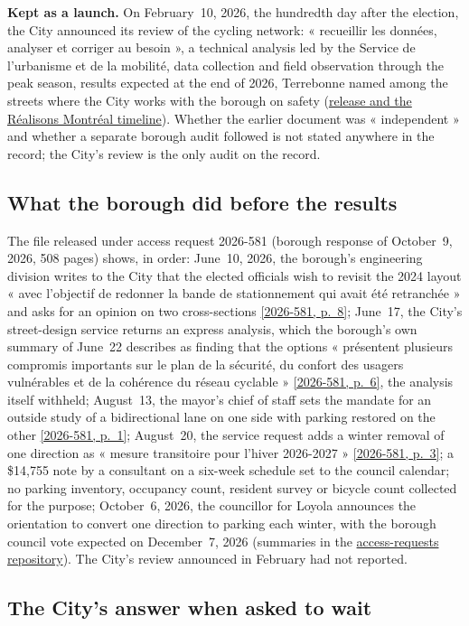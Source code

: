 \documentclass[11pt,letterpaper]{article}
\newcommand{\repourl}{https://github.com/OpenMobilityData/Terrebonne-open-sources}
\newcommand{\doc}[2]{\href{\repourl/blob/main/#1}{#2}}
\newcommand{\arurl}{https://github.com/OpenMobilityData/Terrebonne-access-requests}
\newcommand{\pagesurl}{https://openmobilitydata.github.io/Terrebonne-access-requests}
\newcommand{\pgl}[2]{\href{\pagesurl/2026-581/raw/01_emails_mandate_counts.pdf\#page=#1}{\textsf{\small[2026-581, p.~#2]}}}
\newcommand{\pg}[1]{\pgl{#1}{#1}}
\begin{document}
\textbf{Kept as a launch.} On February~10, 2026, the hundredth day after the
election, the City announced its review of the cycling network: « recueillir
les données, analyser et corriger au besoin », a technical analysis led by the
Service de l'urbanisme et de la mobilité, data collection and field
observation through the peak season, results expected at the end of 2026,
Terrebonne named among the streets where the City works with the borough on
safety (\doc{2026-city-audit-and-plan-velo/}{release and the Réalisons
Montréal timeline}). Whether the earlier document was « independent » and
whether a separate borough audit followed is not stated anywhere in the
record; the City's review is the only audit on the record.

\subsection{What the borough did before the results}

The file released under access request 2026-581 (borough response of
October~9, 2026, 508 pages) shows, in order: June~10, 2026, the borough's
engineering division writes to the City that the elected officials wish to
revisit the 2024 layout « avec l'objectif de redonner la bande de
stationnement qui avait été retranchée » and asks for an opinion on two
cross-sections \pg{8}; June~17, the City's street-design service returns an
express analysis, which the borough's own summary of June~22 describes as
finding that the options « présentent plusieurs compromis importants sur le
plan de la sécurité, du confort des usagers vulnérables et de la cohérence du
réseau cyclable » \pg{6}, the analysis itself withheld; August~13, the
mayor's chief of staff sets the mandate for an outside study of a
bidirectional lane on one side with parking restored on the other
\pg{1}; August~20, the service request adds a winter removal of one direction
as « mesure transitoire pour l'hiver 2026-2027 » \pg{3}; a \$14,755 note by a
consultant on a six-week schedule set to the council calendar; no parking
inventory, occupancy count, resident survey or bicycle count collected for the
purpose; October~6, 2026, the councillor for Loyola announces the orientation
to convert one direction to parking each winter, with the borough council
vote expected on December~7, 2026 (summaries in the
\href{\arurl/tree/main/2026-581}{access-requests repository}). The City's
review announced in February had not reported.

\subsection{The City's answer when asked to wait}
\end{document}
